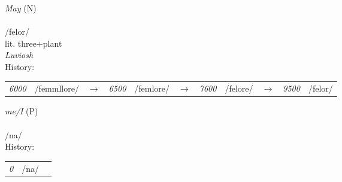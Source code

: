\vspace{15pt}
\begin{nopagebreak}
 \textit{May} (N)\\
\\
\noindent /f{\textprimstress}elor/\\
\noindent lit. three+plant\\
\noindent \textit{Luviosh}\\


\noindent History:

\vspace{-0pt}
\hspace{40pt}
\begin{tabular}{ccc}
\textit{6000} & /femmllore/&$\rightarrow$ & \textit{6500} & /femlore/&$\rightarrow$ & \textit{7600} & /felore/&$\rightarrow$ & \textit{9500} & /felor/& \\
\end{tabular}

\vspace{20pt}\hline

\end{nopagebreak}
\filbreak



\vspace{15pt}
\begin{nopagebreak}
 \textit{me/I} (P)\\
\\
\noindent /n{\textprimstress}a/\\


\noindent History:

\vspace{-0pt}
\hspace{40pt}
\begin{tabular}{ccc}
\textit{0} & /na/& \\
\end{tabular}

\vspace{20pt}\hline

\end{nopagebreak}
\filbreak



